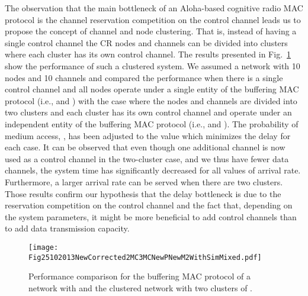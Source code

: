 \documentclass[12pt,journal,oneside,onecolumn]{IEEEtran}
\begin{document}
The observation that the main bottleneck 
of an Aloha-based cognitive radio MAC protocol is the channel reservation competition on 
the control channel  leads us to propose the concept of channel
and node clustering. That is, instead of having a single control channel
the CR nodes and channels can be divided into clusters where each cluster has its own 
control channel. 
The results presented in Fig.~\ref{Fig25102013NewCorrected2MC3MCNewPNewM2WithSim}
show the performance of such a clustered system.
We assumed a network with 10 nodes and 10 channels and compared the performance when there is a single control channel
and all nodes operate under a single entity of the buffering MAC protocol (i.e.,  and ) with
the case where the nodes and channels are divided into two clusters and
each cluster has its own control channel and operate under an independent 
entity of the buffering MAC protocol (i.e.,  and ). The probability of medium access, , has been 
adjusted to the value which minimizes the delay for each case.
It can be observed that even though one additional channel is now used as
a control channel in the two-cluster case, and we thus have fewer data channels, the system time 
has significantly decreased for all values of arrival rate. Furthermore, a larger arrival rate can be 
served when there are two clusters. Those results confirm our hypothesis that the delay bottleneck is due to the reservation
competition on the control channel and the
fact that, depending on the system parameters, it might be more beneficial to add control channels than to add
data transmission capacity. 
\begin{figure}\centering
\texttt{[image: Fig25102013NewCorrected2MC3MCNewPNewM2WithSimMixed.pdf]}\\
\caption{Performance comparison for the buffering MAC protocol of a network with  and the clustered network with two clusters of .}\label{Fig25102013NewCorrected2MC3MCNewPNewM2WithSim}\end{figure}
\end{document}
